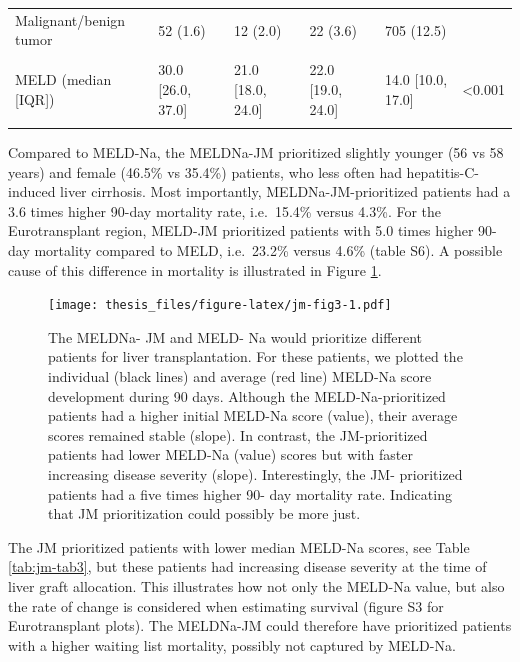 \documentclass[11pt,english,]{book} %
\begin{document}
\begin{landscape}
\begin{table}
{\begin{tabular}[t]{llllll}
\hspace{1em}Malignant/benign tumor & 52 (1.6) & 12 (2.0) & 22 (3.6) & 705 (12.5) & \\
\hspace{1em}\cellcolor{gray!6}{Other} & \cellcolor{gray!6}{66 (2.1)} & \cellcolor{gray!6}{19 (3.1)} & \cellcolor{gray!6}{5 (0.8)} & \cellcolor{gray!6}{130 (2.3)} & \cellcolor{gray!6}{}\\
MELD (median [IQR]) & 30.0 [26.0, 37.0] & 21.0 [18.0, 24.0] & 22.0 [19.0, 24.0] & 14.0 [10.0, 17.0] & <0.001\\
\cellcolor{gray!6}{MELD-Na (median [IQR])} & \cellcolor{gray!6}{31.0 [27.0, 35.0]} & \cellcolor{gray!6}{21.0 [19.0, 22.0]} & \cellcolor{gray!6}{25.0 [24.0, 27.0]} & \cellcolor{gray!6}{13.0 [9.0, 17.0]} & \cellcolor{gray!6}{<0.001}\\
\bottomrule
\end{tabular}}
\end{table}
\end{landscape}

Compared to MELD-Na, the MELDNa-JM prioritized slightly younger (56 vs 58 years) and female (46.5\% vs 35.4\%) patients, who less often had hepatitis-C-induced liver cirrhosis. Most importantly, MELDNa-JM-prioritized patients had a 3.6 times higher 90-day mortality rate, i.e.~15.4\% versus 4.3\%. For the Eurotransplant region, MELD-JM prioritized patients with 5.0 times higher 90-day mortality compared to MELD, i.e.~23.2\% versus 4.6\% (table S6). A possible cause of this difference in mortality is illustrated in Figure \ref{fig:jm-fig3}.

\begin{figure}
\centering
\texttt{[image: thesis\_files/figure-latex/jm-fig3-1.pdf]}
\caption{\label{fig:jm-fig3}The MELDNa- JM and MELD- Na would prioritize different patients for liver transplantation. For these patients, we plotted the individual (black lines) and average (red line) MELD-Na score development during 90 days. Although the MELD-Na-prioritized patients had a higher initial MELD-Na score (value), their average scores remained stable (slope). In contrast, the JM-prioritized patients had lower MELD-Na (value) scores but with faster increasing disease severity (slope). Interestingly, the JM- prioritized patients had a five times higher 90- day mortality rate. Indicating that JM prioritization could possibly be more just.}
\end{figure}

The JM prioritized patients with lower median MELD-Na scores, see Table \ref{tab:jm-tab3}, but these patients had increasing disease severity at the time of liver graft allocation. This illustrates how not only the MELD-Na value, but also the rate of change is considered when estimating survival (figure S3 for Eurotransplant plots). The MELDNa-JM could therefore have prioritized patients with a higher waiting list mortality, possibly not captured by MELD-Na.
\end{document}
